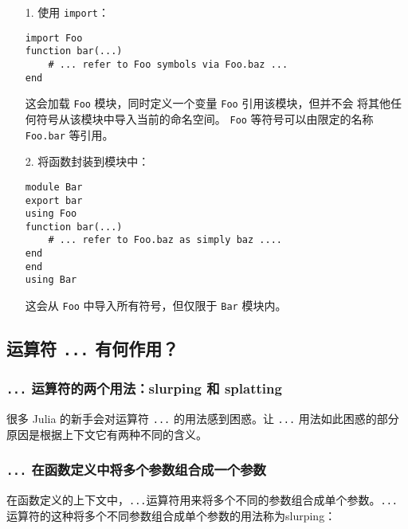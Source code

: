 \begin{itemize}
\item[1. ] 使用 \texttt{import}：


\begin{verbatim}
import Foo
function bar(...)
    # ... refer to Foo symbols via Foo.baz ...
end
\end{verbatim}

这会加载 \texttt{Foo} 模块，同时定义一个变量 \texttt{Foo} 引用该模块，但并不会 将其他任何符号从该模块中导入当前的命名空间。 \texttt{Foo} 等符号可以由限定的名称 \texttt{Foo.bar} 等引用。


\item[2. ] 将函数封装到模块中：


\begin{verbatim}
module Bar
export bar
using Foo
function bar(...)
    # ... refer to Foo.baz as simply baz ....
end
end
using Bar
\end{verbatim}

这会从 \texttt{Foo} 中导入所有符号，但仅限于 \texttt{Bar} 模块内。

\end{itemize}


\hypertarget{425348862563535930}{}


\subsection{运算符 \texttt{...} 有何作用？}



\hypertarget{6176809975782961444}{}


\subsubsection{\texttt{...} 运算符的两个用法：slurping 和 splatting}



很多 Julia 的新手会对运算符 \texttt{...} 的用法感到困惑。让 \texttt{...} 用法如此困惑的部分原因是根据上下文它有两种不同的含义。



\hypertarget{7095517523544633865}{}


\subsubsection{\texttt{...} 在函数定义中将多个参数组合成一个参数}



在函数定义的上下文中，\texttt{...}运算符用来将多个不同的参数组合成单个参数。\texttt{...}运算符的这种将多个不同参数组合成单个参数的用法称为slurping：




